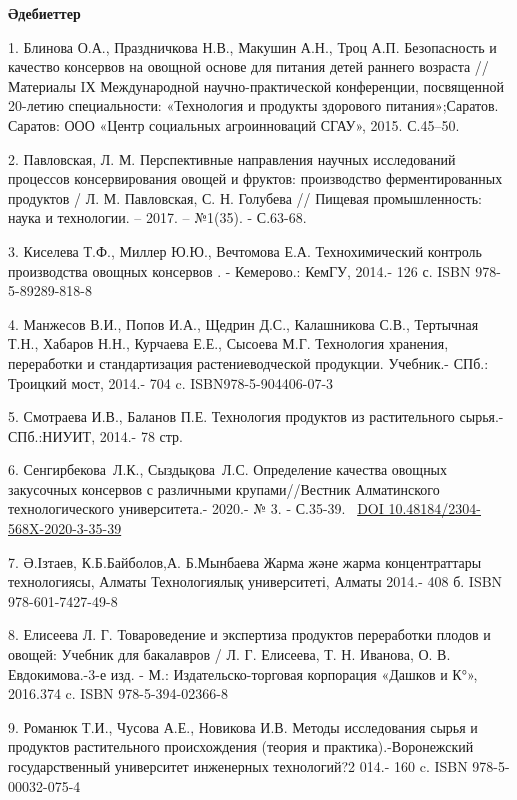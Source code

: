 \begin{center}
{\bfseries Әдебиеттер}
\end{center}

\begin{references}
1. Блинова О.А., Праздничкова Н.В., Макушин А.Н., Троц А.П. Безопасность
и качество консервов на овощной основе для питания детей раннего
возраста // Материалы IХ Международной научно-практической конференции,
посвященной 20-летию специальности: «Технология и продукты здорового
питания»;Саратов. Саратов: ООО «Центр социальных агроинноваций СГАУ»,
2015. С.45--50.

2. Павловская, Л. М. Перспективные направления научных исследований
процессов консервирования овощей и фруктов: производство
ферментированных продуктов / Л. М. Павловская, С. Н. Голубева // Пищевая
промышленность: наука и технологии. -- 2017. -- №1(35). - С.63-68.

3. Киселева Т.Ф., Миллер Ю.Ю., Вечтомова Е.А. Технохимический контроль
производства овощных консервов . - Кемерово.: КемГУ, 2014.- 126 с. ISBN
978-5-89289-818-8

4. Манжесов В.И., Попов И.А., Щедрин Д.С., Калашникова С.В., Тертычная
Т.Н., Хабаров Н.Н., Курчаева Е.Е., Сысоева М.Г. Технология хранения,
переработки и стандартизация растениеводческой продукции. Учебник.-
СПб.: Троицкий мост, 2014.- 704 c. ISBN978-5-904406-07-3

5. Смотраева И.В., Баланов П.Е. Технология продуктов из растительного
сырья.- СПб.:НИУИТ, 2014.- 78 стр.

6. Сенгирбекова~Л.К., Сыздықова~Л.С. Определение качества овощных
закусочных консервов с различными крупами//Вестник Алматинского
технологического университета.- 2020.- № 3. - С.35-39.~
\href{https://doi.org/10.48184/2304-568X-2020-3-35-39}{DOI
10.48184/2304-568X-2020-3-35-39}

7. Ә.Ізтаев, К.Б.Байболов,А. Б.Мынбаева Жарма және жарма концентраттары
технологиясы, Алматы Технологиялық университеті, Алматы 2014.- 408 б.
ISBN 978-601-7427-49-8

8. Елисеева Л. Г. Товароведение и экспертиза продуктов переработки
плодов и овощей: Учебник для бакалавров / Л. Г. Елисеева, Т. Н. Иванова,
О. В. Евдокимова.-3-е изд. - М.: Издательско-торговая корпорация «Дашков
и К°», 2016.374 c. ISBN 978-5-394-02366-8

9. Романюк Т.И., Чусова А.Е., Новикова И.В. Методы исследования сырья и
продуктов растительного происхождения (теория и практика).-Воронежский
государственный университет инженерных технологий?2 014.- 160 c. ISBN
978-5-00032-075-4


\end{references}
